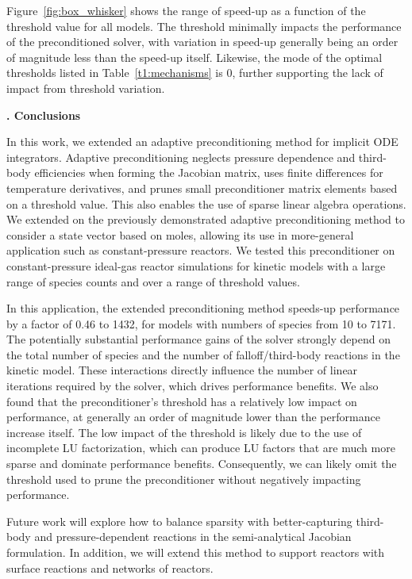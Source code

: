 \documentclass[twocolumn,10pt]{article} %
\renewcommand{\section}%
              [1]%
              {%
               \bgroup%
               \flushleft%
               \small\bf%
               \stepcounter{section}%
               \arabic{section}. #1%
               \par%
               \egroup%
              }%
\newcommand{\sectionOne}[1]{\section{#1} \addvspace{10pt}}
\begin{document}
Figure~\ref{fig:box_whisker} shows the range of speed-up as a function of the threshold value for all models.
The threshold minimally impacts the performance of the preconditioned solver, with variation in speed-up generally being an order of magnitude less than the speed-up itself.
Likewise, the mode of the optimal thresholds listed in Table~\ref{t1:mechanisms} is 0, further supporting the lack of impact from threshold variation.

\sectionOne{Conclusions}

In this work, we extended an adaptive preconditioning method for implicit ODE integrators.
Adaptive preconditioning neglects pressure dependence and third-body efficiencies when forming the Jacobian matrix,
uses finite differences for temperature derivatives, and prunes small preconditioner matrix elements based on a threshold value.
This also enables the use of sparse linear algebra operations.
We extended on the previously demonstrated adaptive preconditioning method to consider a state vector based on moles, allowing its use in more-general application such as constant-pressure reactors.
We tested this preconditioner on constant-pressure ideal-gas reactor simulations for kinetic models with a large range of species counts and over a range of threshold values.

In this application, the extended preconditioning method speeds-up performance by a factor of 0.46 to 1432, for models with numbers of species from 10 to 7171.
The potentially substantial performance gains of the solver strongly depend on the total number of species and the number of falloff\slash third-body reactions in the kinetic model.
These interactions directly influence the number of linear iterations required by the solver, which drives performance benefits.
We also found that the preconditioner's threshold has a relatively low impact on performance, at generally an order of magnitude lower than the performance increase itself.
The low impact of the threshold is likely due to the use of incomplete LU factorization, which can produce LU factors that are much more sparse and dominate performance benefits.
Consequently, we can likely omit the threshold used to prune the preconditioner without negatively impacting performance.

Future work will explore how to balance sparsity with better-capturing third-body and pressure-dependent reactions in the semi-analytical Jacobian formulation.
In addition, we will extend this method to support reactors with surface reactions and networks of reactors.
\end{document}

